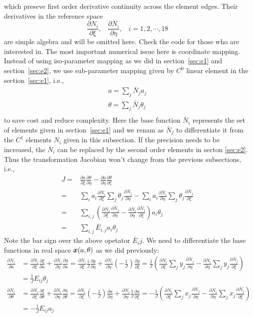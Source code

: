 \documentclass{report}
\newcommand{\bm}[1]{\mbox{\boldmath $#1$}}
\newcommand{\ff}[2]{\frac{#1}{#2}}
\newcommand{\pp}[2]{\frac{\partial{#1}}{\partial{#2}}}
\begin{document}
which preseve first order derivative continuity across the element edges. 
Their derivatives in the reference space
$$
\pp{N_i}{\xi}, \;\;\;
\pp{N_i}{\eta}, \;\;\; i=1, 2, \cdots, 18
$$
are simple algebra and will be omitted here.
Check the code for those who are interested in.
The most important numerical issue here is coordinate mapping.
Instead of using iso-parameter mapping as we did in section~\ref{sec:e1}
and section~\ref{sec:e2},
we use sub-parameter mapping 
given by $C^0$ linear element in the section~\ref{sec:e1}, i.e.,
\begin{equation}
\begin{array}{l}
a=\sum_j \bar{N}_j a_j\\
\theta=\sum_j \bar{N}_j \theta_j\\
\end{array}
\end{equation}
to save cost and reduce complexity.
Here the base function $\bar{N}_i$ represents the set of elements given in section~\ref{sec:e1}
and we renam as $\bar{N}_j$ to differentiate it from the $C^1$ elements $N_i$ given in this subsection.
If the precision needs to be increased, the $\bar{N}_i$ can be replaced 
by the second order elements in secton \ref{sec:e2}.
Thus the transformation Jacobian won't change from the previous subsections, i.e.,
$$
\begin{array}{rl}
J = & \pp{a}{\xi}  \pp{\theta}{\eta} - \pp{a}{\eta} \pp{\theta}{\xi} \\
  = & \sum_i a_i \pp{\bar{N}_i}{\xi}  \sum_j \theta_j \pp{\bar{N}_j}{\eta} - 
      \sum_i a_i \pp{\bar{N}_i}{\eta} \sum_j \theta_j \pp{\bar{N}_j}{\xi} \\
  = & \sum_{i,j} (\pp{\bar{N}_i}{\xi}  \pp{\bar{N}_j}{\eta} - 
                  \pp{\bar{N}_i}{\eta} \pp{\bar{N}_j}{\xi}) a_i \theta_j \\
  = & \sum_{i,j} \bar{E}_{i,j} a_i \theta_j
\end{array}
$$
Note the bar sign over the above  opetator $\bar{E}_ij$.
We need to differentiate the base functions in real space $\bm{x}(a,\theta)$
as we did previously:
$$
\begin{array}{ll}
\pp{N_i}{a} & = \pp{N_i}{\xi} \pp{\xi}{a} + \pp{N_i}{\eta} \pp{\eta}{a}
            = \pp{N_i}{\xi} \ff{1}{J} \pp{y}{\eta} + \pp{N_i}{\eta} (-\ff{1}{J}) \pp{y}{\xi}
            = \ff{1}{J} (\pp{N_i}{\xi} \sum_jy_j\pp{\bar{N}_j}{\eta} - \pp{N_i}{\eta} \sum_jy_j\pp{\bar{N}_j}{\xi})
\\
            & = \ff{1}{J} E_{ij} \theta_j
\\
\pp{N_i}{\theta} & = \pp{N_i}{\xi} \pp{\xi}{\theta} + \pp{N_i}{\eta} \pp{\eta}{\theta}
                 = \pp{N_i}{\xi} (-\ff{1}{J}) \pp{a}{\eta} + \pp{N_i}{\eta} \ff{1}{J} \pp{a}{\xi}
                 = - \ff{1}{J} (\pp{N_i}{\xi} \sum_jx_j\pp{\bar{N}_j}{\eta} - \pp{N_i}{\eta} \sum_jx_j\pp{\bar{N}_j}{\xi})
\\
                 & = - \ff{1}{J} E_{ij} a_j
\end{array}
$$
\end{document}
